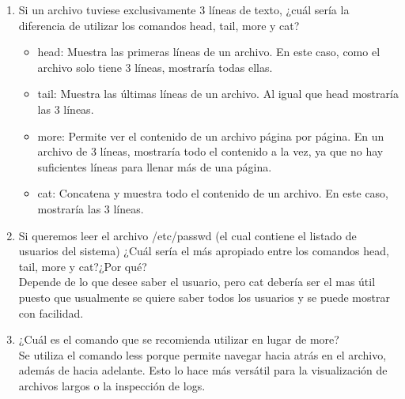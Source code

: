 \documentclass{article}
\begin{document}
\begin{enumerate}
    \item Si un archivo tuviese exclusivamente 3 líneas de texto, ¿cuál sería la diferencia de utilizar los comandos head, tail, more y cat?

    \begin{itemize}
        \item head: Muestra las primeras líneas de un archivo. En este caso, como el archivo solo tiene 3 líneas, mostraría todas ellas.
        \item tail: Muestra las últimas líneas de un archivo. Al igual que head mostraría las 3 líneas.
        \item more: Permite ver el contenido de un archivo página por página. En un archivo de 3 líneas, mostraría todo el contenido a la vez, ya que no hay suficientes líneas para llenar más de una página.
        \item cat: Concatena y muestra todo el contenido de un archivo. En este caso, mostraría las 3 líneas.
    \end{itemize}

    \item Si queremos leer el archivo /etc/passwd (el cual contiene el listado de usuarios del sistema) ¿Cuál sería el más apropiado entre los comandos head, tail, more y cat?¿Por qué?
    \\
    Depende de lo que desee saber el usuario, pero cat debería ser el mas útil puesto que usualmente se quiere saber todos los usuarios y se puede mostrar con facilidad.
    
    \item ¿Cuál es el comando que se recomienda utilizar en lugar de more?
    \\
    Se utiliza el comando less porque permite navegar hacia atrás en el archivo, además de hacia adelante. Esto lo hace más versátil para la visualización de archivos largos o la inspección de logs.

\end{enumerate}
\newpage
\end{document}
